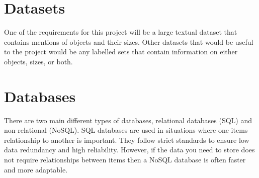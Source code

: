 \section{Datasets}

One of the requirements for this project will be a large textual dataset that contains mentions of objects and their sizes. Other datasets that would be useful to the project would be any labelled sets that contain information on either objects, sizes, or both.

\section{Databases}

There are two main different types of databases, relational databases (SQL) and non-relational (NoSQL). SQL databases are used in situations where one items relationship to another is important. They follow strict standards to ensure low data redundancy and high reliability. However, if the data you need to store does not require relationships between items then a NoSQL database is often faster and more adaptable.
